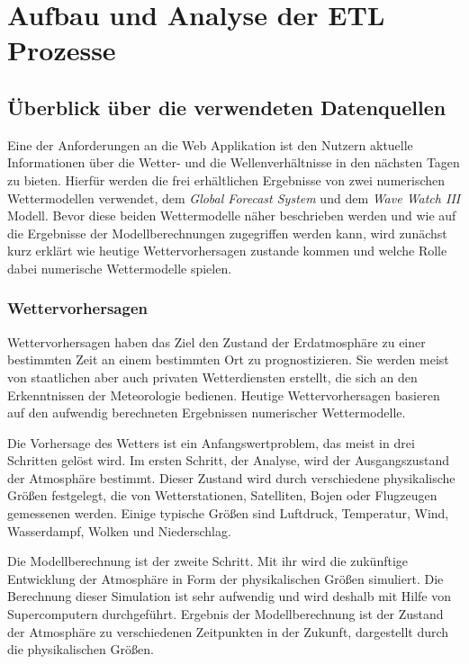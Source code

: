 
\chapter{Aufbau und Analyse der ETL Prozesse}

\section{Überblick über die verwendeten Datenquellen}
Eine der Anforderungen an die Web Applikation ist den Nutzern aktuelle
Informationen über die Wetter- und die Wellenverhältnisse in den
nächsten Tagen zu bieten. Hierfür werden die frei erhältlichen
Ergebnisse von zwei numerischen Wettermodellen verwendet, dem
\textit{Global Forecast System} und dem \textit{Wave Watch III}
Modell. Bevor diese beiden Wettermodelle näher beschrieben werden und
wie auf die Ergebnisse der Modellberechnungen zugegriffen werden kann,
wird zunächst kurz erklärt wie heutige Wettervorhersagen zustande
kommen und welche Rolle dabei numerische Wettermodelle spielen.

\subsection{Wettervorhersagen}
Wettervorhersagen haben das Ziel den Zustand der Erdatmosphäre zu
einer bestimmten Zeit an einem bestimmten Ort zu prognostizieren. Sie
werden meist von staatlichen aber auch privaten Wetterdiensten
erstellt, die sich an den Erkenntnissen der Meteorologie
bedienen. Heutige Wettervorhersagen basieren auf den aufwendig
berechneten Ergebnissen numerischer Wettermodelle.

Die Vorhersage des Wetters ist ein Anfangswertproblem, das meist in
drei Schritten gelöst wird. Im ersten Schritt, der Analyse, wird der
Ausgangszustand der Atmosphäre bestimmt. Dieser Zustand wird durch
verschiedene physikalische Größen festgelegt, die von Wetterstationen,
Satelliten, Bojen oder Flugzeugen gemessenen werden. Einige typische
Größen sind Luftdruck, Temperatur, Wind, Wasserdampf, Wolken und
Niederschlag.

Die Modellberechnung ist der zweite Schritt. Mit ihr wird die
zukünftige Entwicklung der Atmosphäre in Form der physikalischen
Größen simuliert. Die Berechnung dieser Simulation ist sehr aufwendig
und wird deshalb mit Hilfe von Supercomputern durchgeführt. Ergebnis
der Modellberechnung ist der Zustand der Atmosphäre zu verschiedenen
Zeitpunkten in der Zukunft, dargestellt durch die physikalischen
Größen.

